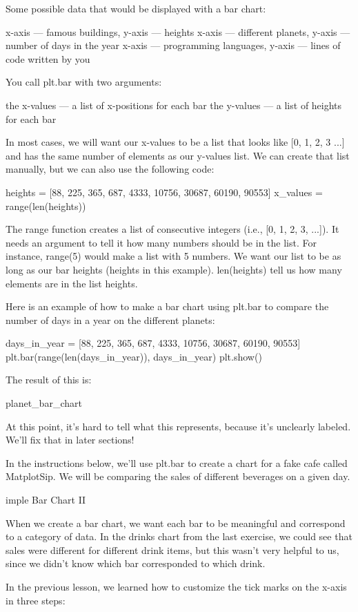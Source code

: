 \documentclass{journal}
\begin{document}
Some possible data that would be displayed with a bar chart:

    x-axis — famous buildings, y-axis — heights
    x-axis — different planets, y-axis — number of days in the year
    x-axis — programming languages, y-axis — lines of code written by you

You call plt.bar with two arguments:

    the x-values — a list of x-positions for each bar
    the y-values — a list of heights for each bar

In most cases, we will want our x-values to be a list that looks like [0, 1, 2, 3 ...] and has the same number of elements as our y-values list. We can create that list manually, but we can also use the following code:

heights = [88, 225, 365, 687, 4333, 10756, 30687, 60190, 90553]
x_values = range(len(heights))

The range function creates a list of consecutive integers (i.e., [0, 1, 2, 3, ...]). It needs an argument to tell it how many numbers should be in the list. For instance, range(5) would make a list with 5 numbers. We want our list to be as long as our bar heights (heights in this example). len(heights) tell us how many elements are in the list heights.

Here is an example of how to make a bar chart using plt.bar to compare the number of days in a year on the different planets:

days_in_year = [88, 225, 365, 687, 4333, 10756, 30687, 60190, 90553]
plt.bar(range(len(days_in_year)),
        days_in_year)
plt.show()

The result of this is:

planet_bar_chart

At this point, it’s hard to tell what this represents, because it’s unclearly labeled. We’ll fix that in later sections!

In the instructions below, we’ll use plt.bar to create a chart for a fake cafe called MatplotSip. We will be comparing the sales of different beverages on a given day.


imple Bar Chart II

When we create a bar chart, we want each bar to be meaningful and correspond to a category of data. In the drinks chart from the last exercise, we could see that sales were different for different drink items, but this wasn’t very helpful to us, since we didn’t know which bar corresponded to which drink.

In the previous lesson, we learned how to customize the tick marks on the x-axis in three steps:
\end{document}

